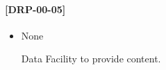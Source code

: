 \documentclass[DM,lsstdraft,STR,toc]{lsstdoc}
\begin{document}
\paragraph{[DRP-00-05]}
\begin{itemize}
  \item None
\begin{note}
Data Facility to provide content.
\end{note}
\end{itemize}
\end{document}
